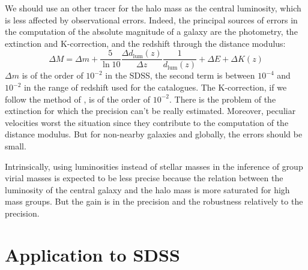 We should use an other tracer for the halo mass as the central luminosity,
which is less affected by observational errors. Indeed, the principal
sources of errors in the computation of the absolute magnitude of a galaxy
are the photometry, the extinction and K-correction, and the redshift
through the distance modulus:
%
\begin{equation}
    \Delta M=\Delta m + \frac{5}{\ln{10}}
    \frac{\Delta d_{\mathrm{lum}} \left(z\right)}{\Delta z}
    \frac{1}{d_{\mathrm{lum}} \left(z\right)} + \Delta E + \Delta K
    \left(z\right)
\end{equation}
%
$\Delta m$ is of the order of $10^{-2}$ in the SDSS, the second term is
between $10^{-4}$ and $10^{-2}$ in the range of redshift used for the
catalogues. The K-correction, if we follow the method of
\citet{Chilingarian+10}, is of the order of $10^{-2}$. There is the problem
of the extinction for which the precision can't be really estimated.
Moreover, peculiar velocities worst the situation since they contribute to
the computation of the distance modulus. But for non-nearby galaxies and
globally, the errors should be small.

Intrinsically, using luminosities instead of stellar masses in the inference
of group virial masses is expected to be less precise because the relation
between the luminosity of the central galaxy and the halo mass is more
saturated for high mass groups. But the gain is in the precision and the
robustness relatively to the precision.

\section{Application to SDSS}
\label{sec:application_to_sdss}


